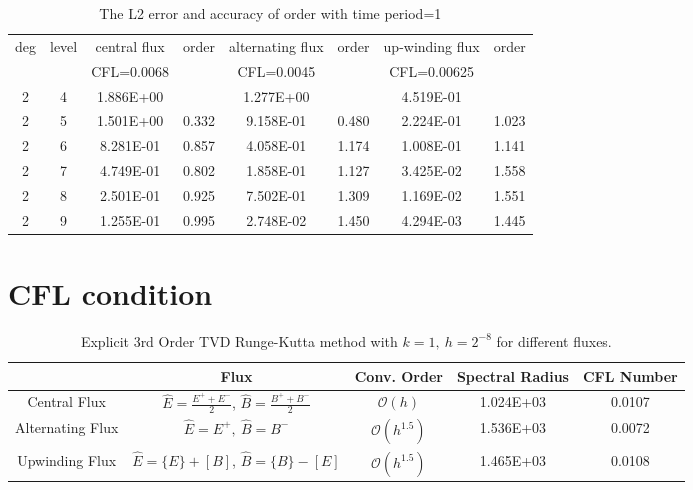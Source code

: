 \documentclass[a4paper]{article}
\begin{document}
\begin{table}[htbp]
\caption{\label{tab:test}The L2 error and accuracy of order with time period=1}
\centering
\vspace{5pt}
\begin{tabular}{cccccccc}
\toprule
deg &level &central flux &order &alternating flux &order &up-winding flux &order\\
       &        &CFL=0.0068 &         &CFL=0.0045       &         &CFL=0.00625         &         \\
\midrule
2 &4 &1.886E+00 &         &1.277E+00 &        &4.519E-01 &        \\
2 &5 &1.501E+00 &0.332&9.158E-01 &0.480&2.224E-01 &1.023\\
2 &6 &8.281E-01 &0.857&4.058E-01 &1.174&1.008E-01 &1.141\\
2 &7 &4.749E-01 &0.802&1.858E-01 &1.127&3.425E-02 &1.558\\
2 &8 &2.501E-01 &0.925&7.502E-01 &1.309&1.169E-02 &1.551\\
2 &9 &1.255E-01 &0.995&2.748E-02 &1.450&4.294E-03 &1.445\\    
\bottomrule
\end{tabular}


\end{table}


\section{CFL condition}


\begin{table}
\centering
\caption*{Explicit 3rd Order TVD Runge-Kutta method with $k=1,\ h=2^{-8}$ for different fluxes.}
\begin{tabular}{c|c|ccc}
\toprule\hline
&Flux & Conv. Order  & Spectral Radius  &CFL Number\\ \hline \vspace{1pt}
Central Flux & $\hat{E}=\frac{E^++E^-}{2}$, $\hat{B}=\frac{B^++B^-}{2}$& $ \mathcal{O}(h)$ & 1.024E+03 &0.0107\\ \vspace{1pt}
Alternating Flux&$\hat{E}=E^+,\ \hat{B}=B^-$  & $\mathcal{O}(h^{1.5})$ &1.536E+03 &0.0072\\ \vspace{1pt}
Upwinding Flux &$\hat{E}=\{E\}+[B]$, $\hat{B}=\{B\}-[E]$  & $\mathcal{O}(h^{1.5})$ &1.465E+03 &0.0108\\ \hline\bottomrule
\end{tabular}
\end{table}
\end{document}
